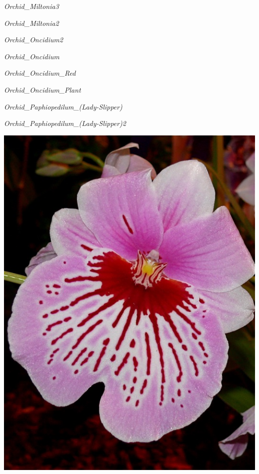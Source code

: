 \documentclass{article}
\begin{document}
\noindent   
\vfill
\centerline{{\Large\emph{Orchid_Miltonia3}}}
\vfill
\newpage

\noindent   
\vfill
\centerline{{\Large\emph{Orchid_Miltonia2}}}
\vfill
\newpage

\noindent   
\vfill
\centerline{{\Large\emph{Orchid_Oncidium2}}}
\vfill
\newpage

\noindent   
\vfill
\centerline{{\Large\emph{Orchid_Oncidium}}}
\vfill
\newpage

\noindent   
\vfill
\centerline{{\Large\emph{Orchid_Oncidium_Red}}}
\vfill
\newpage

\noindent   
\vfill
\centerline{{\Large\emph{Orchid_Oncidium_Plant}}}
\vfill
\newpage

\noindent   
\vfill
\centerline{{\Large\emph{Orchid_Paphiopedilum_(Lady-Slipper)}}}
\vfill
\newpage

\noindent   
\vfill
\centerline{{\Large\emph{Orchid_Paphiopedilum_(Lady-Slipper)2}}}
\vfill
\newpage

\begin{center}
\includegraphics[width=0.9\textheight, angle=90]{../Orchid_Miltonia2.jpg}
\end{center}
\newpage
\end{document}
